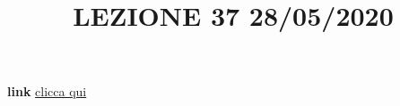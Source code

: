 \newline
\newline
\title{LEZIONE 37 28/05/2020}\newline
\textbf{link} \href{https://web.microsoftstream.com/video/37e99094-ea08-450a-912b-4ada66722981?list=user&userId=faa91214-a6f5-40d7-8875-253fd49b8ce1}{clicca qui}
